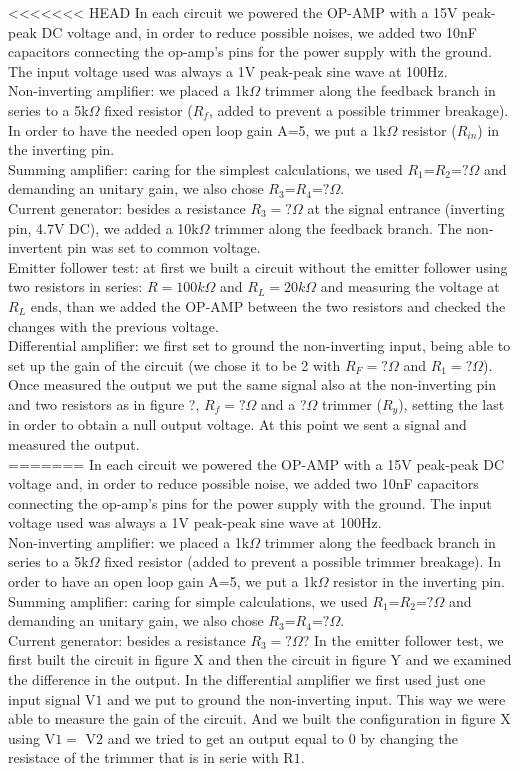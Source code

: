 \documentclass[oneside]{book}
\begin{document}
<<<<<<< HEAD
In each circuit we powered the OP-AMP with a 15V peak-peak DC voltage and, in order to reduce possible noises, we added two 10nF capacitors connecting  the op-amp's pins for the power supply with the ground. The input voltage used was always a 1V peak-peak sine wave at 100Hz.\\
Non-inverting amplifier: we placed a 1k$\Omega$ trimmer along the feedback branch in series to a 5k$\Omega$ fixed resistor ($R_f$, added to prevent a possible trimmer breakage). In order to have the needed open loop gain A=5, we put a 1k$\Omega$ resistor ($R_{in}$) in the inverting pin.\\
Summing amplifier: caring for the simplest calculations, we used $R_1$=$R_2$=$?\Omega$ and demanding an unitary gain, we also chose $R_3$=$R_4$=$?\Omega$.\\
Current generator: besides a resistance $R_3=?\Omega$ at the signal entrance (inverting pin, 4.7V DC), we added a 10k$\Omega$ trimmer along the feedback branch. The non-invertent pin was set to common voltage.\\
Emitter follower test: at first we built a circuit without the emitter follower using two resistors in series: $R=100k\Omega$ and $R_L=20k\Omega$ and measuring the voltage at $R_L$ ends, than we added the OP-AMP between the two resistors and checked the changes with the previous voltage.\\
Differential amplifier: we first set to ground the non-inverting input, being able to set up the gain of the circuit (we chose it to be 2 with $R_F =?\Omega$ and $R_1=?\Omega$). Once measured the output we put the same signal also at the non-inverting pin and two resistors as in figure ?, $R_f=?\Omega$ and a ?$\Omega$ trimmer ($R_y$), setting the last in order to obtain a null output voltage. At this point we sent a signal and measured the output.\\
=======
In each circuit we powered the OP-AMP with a 15V peak-peak DC voltage and, in order to reduce possible noise, we added two 10nF capacitors connecting  the op-amp's pins for the power supply with the ground. The input voltage used was always a 1V peak-peak sine wave at 100Hz.\\
Non-inverting amplifier: we placed a 1k$\Omega$ trimmer along the feedback branch in series to a 5k$\Omega$ fixed resistor (added to prevent a possible trimmer breakage). In order to have an open loop gain A=5, we put a 1k$\Omega$ resistor in the inverting pin.\\
Summing amplifier: caring for simple calculations, we used $R_1$=$R_2$=$?\Omega$ and demanding an unitary gain, we also chose $R_3$=$R_4$=$?\Omega$.\\
Current generator: besides a resistance $R_3=?\Omega$?
In the emitter follower test, we first built the circuit in figure X and then the circuit in figure Y and we examined the difference in the output.
In the differential amplifier we first used just one input signal V$1$ and we put to ground the non-inverting input. This way we were able to measure the gain of the circuit. And we built the configuration in figure X using V$1 =$ V$2$ and we tried to get an output equal to $0$ by changing the resistace of the trimmer that is in serie with R$1$.
\end{document}
